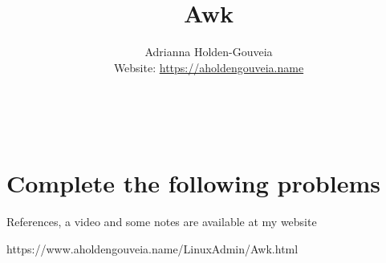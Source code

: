 \documentclass[12pt]{article}
\title{Awk}
\author{
        Adrianna Holden-Gouveia \\
        Website: \url{https://aholdengouveia.name}\\ 
        \date{\vspace{-5ex}}
        \faLinkedin{: aholdengouveia} \\
        \faGithub {: aholdengouveia} \\
        }
\begin{document}
    

\maketitle

\section*{Complete the following problems}

References, a video and some notes are available at my website

https://www.aholdengouveia.name/LinuxAdmin/Awk.html
\end{document}
